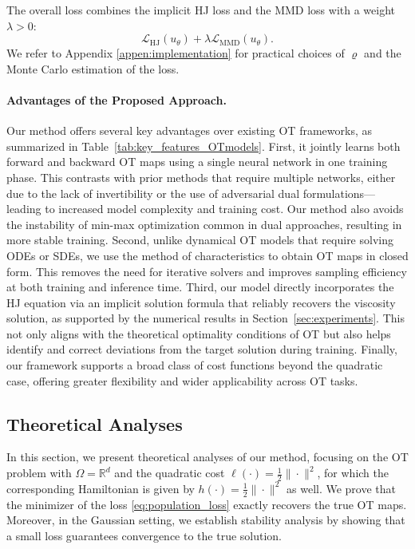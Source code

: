 \documentclass{article} %
\theoremstyle{plain}
\theoremstyle{definition}
\theoremstyle{remark}
\newcommand{\LMMD}{\mathcal{L}_{\text{MMD}}}
\newcommand{\LHJ}{\mathcal{L}_{\text{HJ}}}
\begin{document}
The overall loss combines the implicit HJ loss and the MMD loss with a weight $\lambda > 0$:
\begin{equation}\label{eq:population_loss}
\LHJ\left(u_\theta\right) + \lambda  \LMMD(u_\theta).
\end{equation}
We refer to Appendix \ref{appen:implementation} for practical choices of $\varrho$ and the Monte Carlo estimation of the loss. 

\paragraph{Advantages of the Proposed Approach.}
Our method offers several key advantages over existing OT frameworks, as summarized in Table~\ref{tab:key_features_OTmodels}.
First, it jointly learns both forward and backward OT maps using a single neural network in one training phase. This contrasts with prior methods that require multiple networks, either due to the lack of invertibility or the use of adversarial dual formulations—leading to increased model complexity and training cost. Our method also avoids the instability of min-max optimization common in dual approaches, resulting in more stable training.
Second, unlike dynamical OT models that require solving ODEs or SDEs, we use the method of characteristics to obtain OT maps in closed form. This removes the need for iterative solvers and improves sampling efficiency at both training and inference time.
Third, our model directly incorporates the HJ equation via an implicit solution formula that reliably recovers the viscosity solution, as supported by the numerical results in Section~\ref{sec:experiments}. This not only aligns with the theoretical optimality conditions of OT but also helps identify and correct deviations from the target solution during training.
Finally, our framework supports a broad class of cost functions beyond the quadratic case, offering greater flexibility and wider applicability across OT tasks.

\subsection{Theoretical Analyses}\vspace{-0.3em}
In this section, we present theoretical analyses of our method, focusing on the OT problem with $\Omega=\mathbb{R}^d$ and the quadratic cost $\ell(\cdot)=\frac12\|\cdot\|^2$, for which the corresponding Hamiltonian is given by \(h(\cdot) = \frac{1}{2}\|\cdot\|^2\) as well.
We prove that the minimizer of the loss \eqref{eq:population_loss} exactly recovers the true OT maps. Moreover, in the Gaussian setting, we establish stability analysis by showing that a small loss guarantees convergence to the true solution.
\end{document}
